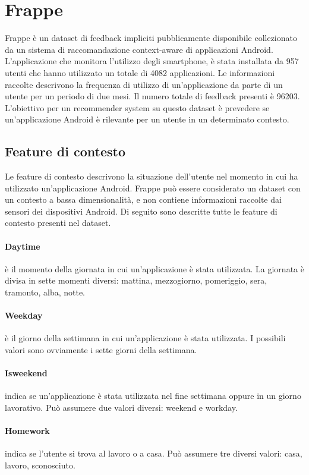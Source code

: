\documentclass[12pt,italian]{report}
\begin{document}
\section{Frappe}
Frappe \cite{frappe} è un dataset di feedback impliciti pubblicamente disponibile collezionato da un sistema di raccomandazione context-aware di applicazioni Android. L'applicazione che monitora l'utilizzo degli smartphone, è stata installata da 957 utenti che hanno utilizzato un totale di 4082 applicazioni. Le informazioni raccolte descrivono la frequenza di utilizzo di un'applicazione da parte di un utente per un periodo di due mesi. Il numero totale di feedback presenti è 96203. L'obiettivo per un recommender system su questo dataset è prevedere se un'applicazione Android è rilevante per un utente in un determinato contesto.

\subsection{Feature di contesto}
Le feature di contesto descrivono la situazione dell'utente nel momento in cui ha utilizzato un'applicazione Android. Frappe può essere considerato un dataset con un contesto a bassa dimensionalità, e non contiene informazioni raccolte dai sensori dei dispositivi Android. Di seguito sono descritte tutte le feature di contesto presenti nel dataset.

\paragraph{Daytime} è il momento della giornata in cui un'applicazione è stata utilizzata. La giornata è divisa in sette momenti diversi: mattina, mezzogiorno, pomeriggio, sera, tramonto, alba, notte.

\paragraph{Weekday} è il giorno della settimana in cui un'applicazione è stata utilizzata. I possibili valori sono ovviamente i sette giorni della settimana.

\paragraph{Isweekend} indica se un'applicazione è stata utilizzata nel fine settimana oppure in un giorno lavorativo. Può assumere due valori diversi: weekend e workday.

\paragraph{Homework} indica se l'utente si trova al lavoro o a casa. Può assumere tre diversi valori: casa, lavoro, sconosciuto.
\end{document}
